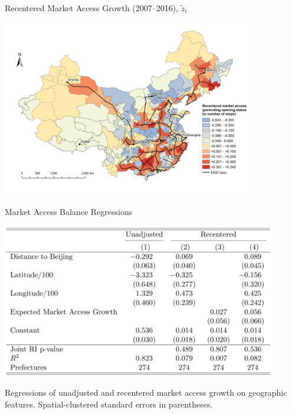 \documentclass{beamer}
\begin{document}
\begin{frame}{Recentered Market Access Growth (2007--2016), $\tilde z_i$}
	\begin{center}
	\includegraphics[trim={1cm 0.5cm 0cm 1cm},clip,width=11cm]{lecture_includes/NlinkRecentered2016.png}
	\end{center}
\end{frame}

\begin{frame}[label=HSRSpecTests]{Market Access Balance Regressions}
\begin{center}
\vspace{-0.4cm}
\includegraphics[width=12cm]{lecture_includes/spec_test.png}

\footnotesize{Regressions of unadjusted and recentered market access growth on geographic features. Spatial-clustered standard errors in parentheses.}

\end{center}

\end{frame}
\end{document}

